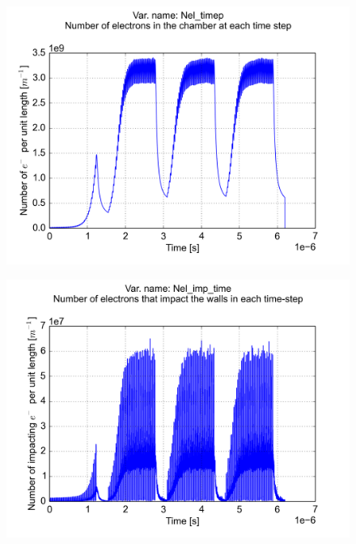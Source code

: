 \documentclass[a4paper,12pt]{article}
\begin{document}
\begin{figure}[p]
\begin{center}
\includegraphics[trim = 0 0 0 0, clip, width=.95\textwidth]{../../example/fig02.png}
\end{center}
\end{figure}

\begin{figure}[p]
\begin{center}
\includegraphics[trim = 0 0 0 0, clip, width=.95\textwidth]{../../example/fig03.png}
\end{center}
\end{figure}
\end{document}
